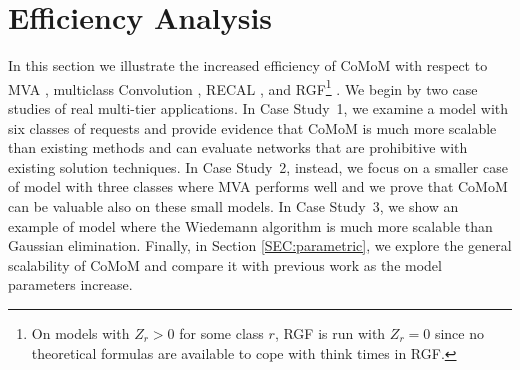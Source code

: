 \documentclass[journal,twocolumn,9.5pt]{IEEEtran}
\begin{document}
\section{Efficiency Analysis}
\label{SEC:efficiencyanalysis}
In this section we illustrate the increased efficiency of CoMoM with respect to MVA \cite{ReiL80}, multiclass Convolution \cite{ReiK75b}, RECAL \cite{ConG86}, and RGF\footnote{On models with $Z_r>0$ for some class $r$, RGF is run with $Z_r=0$ since no theoretical formulas are available to cope with think times in RGF.} \cite{HarC02}. We begin by two case studies of real multi-tier applications. In Case Study~1, we examine a model with six classes of requests and provide evidence that CoMoM is much more scalable than existing methods and can evaluate networks that are prohibitive with existing solution techniques. In Case Study~2, instead, we focus on a smaller case of model with three classes where MVA performs well and we prove that CoMoM can be valuable also on these small models. In Case Study~3, we show an example of model where the Wiedemann algorithm is much more scalable than Gaussian elimination. Finally, in Section \ref{SEC:parametric}, we explore the general scalability of CoMoM and compare it with previous work as the model parameters increase.
\end{document}
